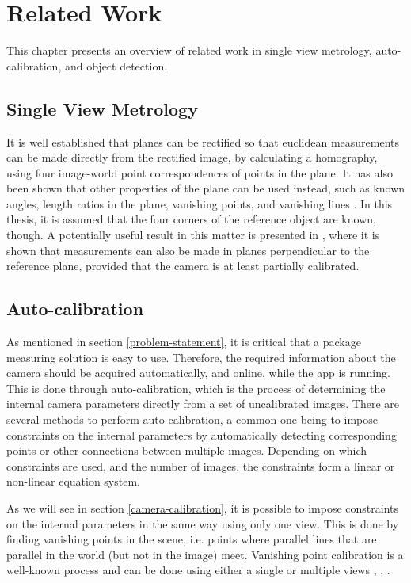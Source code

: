 \chapter{Related Work}
This chapter presents an overview of related work in single view metrology, auto-calibration, and object detection.

\section{Single View Metrology}
It is well established that planes can be rectified so that euclidean measurements can be made directly from the rectified image, by calculating a homography, using four image-world point correspondences of points in the plane. %
It has also been shown that other properties of the plane can be used instead, such as known angles, length ratios in the plane, vanishing points, and vanishing lines \cite{liebowitz1998metric} \cite{criminisi2000single}.
In this thesis, it is assumed that the four corners of the reference object are known, though.
A potentially useful result in this matter is presented in \cite{huang2004new}, where it is shown that measurements can also be made in planes perpendicular to the reference plane, provided that the camera is at least partially calibrated.

\section{Auto-calibration}
As mentioned in section \ref{problem-statement}, it is critical that a package measuring solution is easy to use.
Therefore, the required information about the camera should be acquired automatically, and online, while the app is running.
This is done through auto-calibration, which is the process of determining the internal camera parameters directly from a set of uncalibrated images.
There are several methods to perform auto-calibration, a common one being to impose constraints on the internal parameters by automatically detecting corresponding points or other connections between multiple images. 
Depending on which constraints are used, and the number of images, the constraints form a linear or non-linear equation system. \cite[458-469]{hartley-zisserman}

As we will see in section \ref{camera-calibration}, it is possible to impose constraints on the internal parameters in the same way using only one view.
This is done by finding vanishing points in the scene, i.e. points where parallel lines that are parallel in the world (but not in the image) meet.
Vanishing point calibration is a well-known process and can be done using either a single or multiple views \cite{guillou2000using}, \cite[195-226]{hartley-zisserman}, \cite{caprile1990using}.

